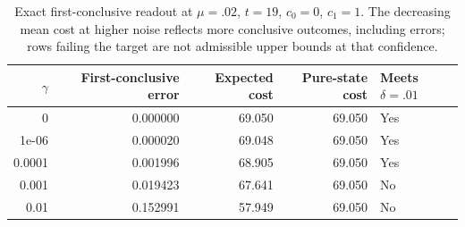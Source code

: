 \begin{table}[htbp]
\centering\small
\begin{tabular}{rrrrl}
\toprule
$\gamma$ & First-conclusive error & Expected cost & Pure-state cost & Meets $\delta=.01$\\
\midrule
0 & 0.000000 & 69.050 & 69.050 & Yes\\
1e-06 & 0.000020 & 69.048 & 69.050 & Yes\\
0.0001 & 0.001996 & 68.905 & 69.050 & Yes\\
0.001 & 0.019423 & 67.641 & 69.050 & No\\
0.01 & 0.152991 & 57.949 & 69.050 & No\\
\bottomrule\end{tabular}
\caption{Exact first-conclusive readout at $\mu=.02$, $t=19$, $c_0=0$, $c_1=1$.
The decreasing mean cost at higher noise reflects more conclusive outcomes, including errors;
rows failing the target are not admissible upper bounds at that confidence.}
\label{tab:crossover}
\end{table}
